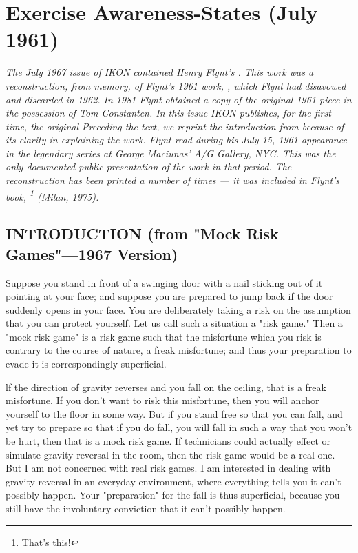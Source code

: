 \chapter{Exercise Awareness-States (July 1961)}

{
\itshape
The July 1967 issue of IKON contained Henry Flynt's .
This work was a reconstruction, from memory, of Flynt's 1961 work, 
, which Flynt had disavowed and discarded in 1962. 
In 1981 Flynt obtained a copy of the original 1961 piece in the possession 
of Tom Constanten. In this issue IKON publishes, for the first time, the 
original  Preceding the text, we reprint the 
introduction from  because of its clarity in explaining the 
work. Flynt read  during his July 15, 1961 
appearance in the legendary series at George Maciunas' A/G Gallery, NYC. 
This was the only documented public presentation of the work in that period. 
The reconstruction  has been printed a number of 
times --- it was included in Flynt's book, \footnote{That's this!}
(Milan, 1975). 
}


\section*{INTRODUCTION (from "Mock Risk Games"---1967 Version)}


Suppose you stand in front of a swinging door with a nail sticking out of it 
pointing at your face; and suppose you are prepared to jump back if the door 
suddenly opens in your face. You are deliberately taking a risk on the 
assumption that you can protect yourself. Let us call such a situation a "risk 
game." Then a "mock risk game" is a risk game such that the misfortune 
which you risk is contrary to the course of nature, a freak misfortune; and 
thus your preparation to evade it is correspondingly superficial. 

lf the direction of gravity reverses and you fall on the ceiling, that is a freak 
misfortune. If you don't want to risk this misfortune, then you will anchor 
yourself to the floor in some way. But if you stand free so that you can fall, 
and yet try to prepare so that if you do fall, you will fall in such a way that 
you won't be hurt, then that is a mock risk game. If technicians could actually 
effect or simulate gravity reversal in the room, then the risk game would be 
a real one. But I am not concerned with real risk games. I am interested in 
dealing with gravity reversal in an everyday environment, where everything 
tells you it can't possibly happen. Your "preparation" for the fall is thus 
superficial, because you still have the involuntary conviction that it can't 
possibly happen. 

